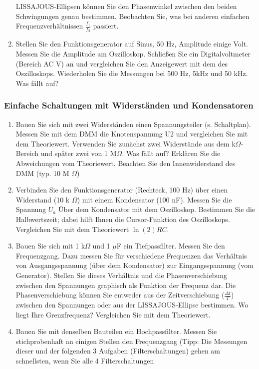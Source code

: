 \documentclass[12pt]{scrartcl}
\begin{document}
\begin{enumerate}
LISSAJOUS-Ellipsen können Sie den Phasenwinkel zwischen den beiden Schwingungen genau bestimmen. Beobachten Sie, was bei anderen einfachen Frequenzverhältnissen $\frac{f_1}{f_2}$ passiert.
\item
Stellen Sie den Funktionsgenerator auf Sinus, 50 Hz, Amplitude einige Volt. Messen Sie die Amplitude am Oszilloskop. Schließen Sie ein Digitalvoltmeter (Bereich AC V) an und vergleichen Sie den Anzeigewert mit dem des Oszilloskops. Wiederholen Sie die Messungen bei 500 Hz, 5kHz und 50 kHz. Was fällt auf?
\end{enumerate}
\subsubsection{Einfache Schaltungen mit Widerständen und Kondensatoren} 
\begin{enumerate}
\item
Bauen Sie sich mit zwei Widerständen einen Spannungsteiler (s. Schaltplan). Messen Sie mit dem DMM die Knotenspannung U2 und vergleichen Sie mit dem Theoriewert. Verwenden Sie zunächst zwei Widerstände aus dem k$\Omega$-Bereich und später zwei von 1 M$\Omega$. Was fällt auf? Erklären Sie die Abweichungen vom Theoriewert. Beachten Sie den Innenwiderstand des DMM (typ. 10 M
$\Omega$)
\item
Verbinden Sie den Funktionsgenerator (Rechteck, 100 Hz) über einen Widerstand (10 k
$\Omega$) mit einem Kondensator (100 nF). Messen Sie die Spannung $U_a$ Über dem Kondensator mit dem Oszilloskop. Bestimmen
Sie die Halbwertszeit; dabei hilft Ihnen die Cursor-Funktion des Oszilloskops. Vergleichen Sie mit dem Theoriewert $\ln(2)RC$.
\item
Bauen Sie sich mit 1 k$\Omega$ und 1
$\mu$F ein Tiefpassfilter. Messen Sie den Frequenzgang. Dazu messen Sie für
verschiedene Frequenzen das Verhältnis von Ausgangsspannung (über dem Kondensator) zur Eingangsspannung (vom Generator). Stellen Sie dieses Verhältnis und die Phasenverschiebung zwischen den Spannungen graphisch als Funktion der Frequenz dar. Die Phasenverschiebung können Sie entweder aus der Zeitverschiebung ($\frac{\Delta t}{T}$) zwischen den Spannungen oder aus der LISSAJOUS-Ellipse bestimmen. Wo liegt Ihre Grenzfrequenz? Vergleichen Sie mit dem Theoriewert.
\item
Bauen Sie mit denselben Bauteilen ein Hochpassfilter. Messen Sie stichprobenhaft an einigen Stellen den Frequenzgang (Tipp: Die Messungen dieser und der folgenden 3 Aufgaben (Filterschaltungen) gehen am schnellsten, wenn Sie alle 4 Filterschaltungen

\end{enumerate}
\end{document}
